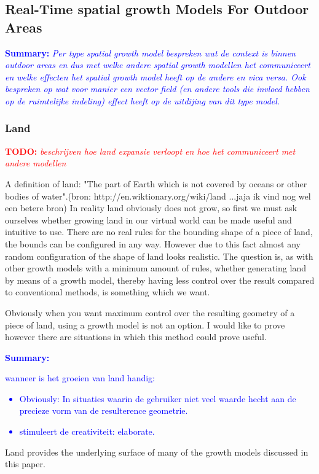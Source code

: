 \documentclass{article}
\newcommand{\todo}[1]{\textcolor{red}{\textbf{\newline TODO: }\it{#1} \newline}}
\newcommand{\inhoud}[1]{\textcolor{blue}{\textbf{\newline Summary: }\it{#1}}}
\begin{document}
\subsection{Real-Time spatial growth Models For Outdoor Areas}
\inhoud{Per type spatial growth model bespreken wat de context is binnen outdoor areas en dus met 
welke andere spatial growth modellen het communiceert en welke effecten het spatial growth model heeft 
op de andere en vica versa. Ook bespreken op wat voor manier een vector field (en andere tools 
die invloed hebben op de ruimtelijke indeling)  effect heeft op de uitdijing van dit type model.   
}

\subsubsection{Land} 
\todo{beschrijven hoe land expansie verloopt en hoe het communiceert met andere modellen}

A definition of land: "The part of Earth which is not covered by oceans or other bodies of water".(bron: http://en.wiktionary.org/wiki/land ...jaja ik vind nog wel een betere bron)
In reality land obviously does not grow, so first we must ask ourselves whether growing land in our virtual world can be made useful and intuitive to use. There are no real rules for the bounding shape of a piece of land, the bounds can be configured in any way. However due to this fact almost any random configuration of the shape of land looks realistic. The question is, as with other growth models with a minimum amount of rules, whether generating land by means of a growth model, thereby having less control over the result compared to conventional methods, is something which we want. 

Obviously when you want maximum control over the resulting geometry of a piece of land, using a growth model is not an option. I would like to prove however there are situations in which this method could prove useful. 

\inhoud
{wanneer is het groeien van land handig: 
\begin{itemize}
\item Obviously: In situaties waarin de gebruiker niet veel waarde hecht aan de precieze vorm van de resulterence geometrie.  
\item stimuleert de creativiteit: elaborate. 
\end{itemize}
}

Land provides the underlying surface of many of the growth models discussed in this paper. 
\end{document}
